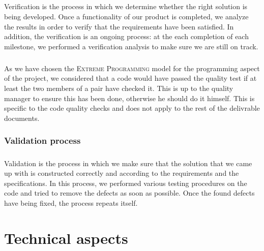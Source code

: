 \documentclass{report}
\begin{document}
\paragraph{}
\hspace{4mm}\textnormal{Verification is the process in which we determine
whether the right solution is being developed.
Once a functionality of our product is completed, 
we analyze the results in order to
 verify that the requirements have been satisfied. 
 In addition, the verification is an ongoing process:
 at the each completion of each milestone, 
we performed a verification analysis to make 
sure we are still on track.
}

\paragraph{}
\hspace{4mm}\textnormal{As we have chosen the \textsc{Extreme Programming} model for the programming 
aspect of the project, we considered that a code would have passed
 the quality test if at least the two members of a pair have checked 
it. This is up to the quality manager to ensure this has been done, 
otherwise he should do it himself. This is specific to the code quality 
checks and does not apply to the rest of the delivrable documents.}

\subsection{Validation process}

\paragraph{}
\hspace{4mm}\textnormal{Validation is the process in which we make sure that the solution
that we came up with is 
constructed correctly and according to the requirements 
and the specifications.
In this process, we performed various testing procedures on
 the code and tried to remove the defects as soon as possible. 
Once the found defects have being fixed, the process repeats itself.}

\paragraph{}
\hspace{4mm}\textnormal{}

\chapter{Technical aspects}
\end{document}
